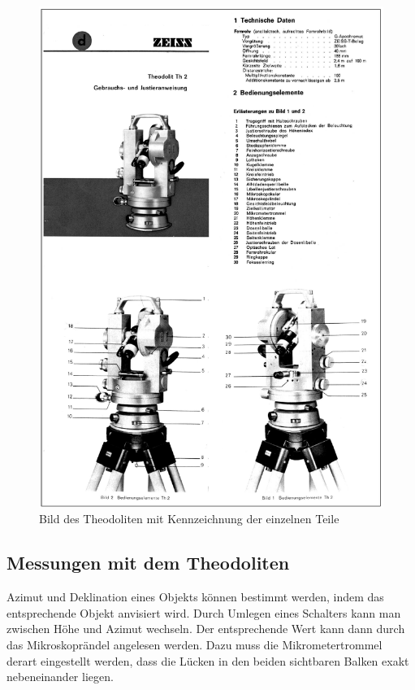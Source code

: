 \begin{figure}
\includegraphics[width=1\textwidth]{images/theodolit}
\caption{Bild des Theodoliten mit Kennzeichnung der einzelnen Teile}
\label{fig:Theodolit}
\end{figure}

\subsection{Messungen mit dem Theodoliten}
Azimut und Deklination eines Objekts können bestimmt werden, indem das entsprechende Objekt anvisiert wird. Durch Umlegen eines Schalters kann man zwischen Höhe und Azimut wechseln. Der entsprechende Wert kann dann durch das Mikroskoprändel angelesen werden. Dazu muss die Mikrometertrommel derart eingestellt werden, dass die Lücken in den beiden sichtbaren Balken exakt nebeneinander liegen. 

